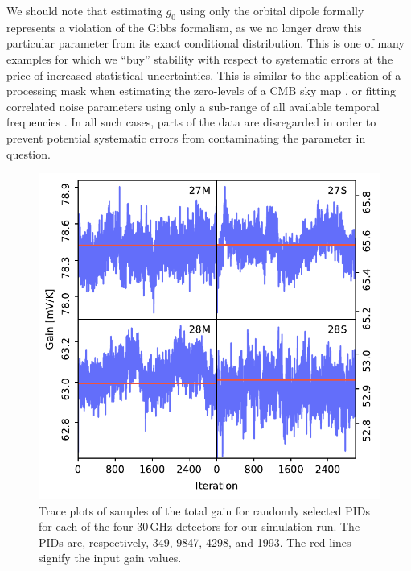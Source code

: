 \documentclass[twocolumn]{aa}
\begin{document}
We should note that estimating $g_0$ using only the orbital dipole
formally represents a violation of the Gibbs formalism, as we no
longer draw this particular parameter from its exact conditional
distribution. This is one of many examples for which we ``buy''
stability with respect to systematic errors at the price of increased
statistical uncertainties. This is similar to the application of a
processing mask when estimating the zero-levels of a CMB sky map
\citep[e.g.,][]{planck2014-a10}, or fitting correlated noise
parameters using only a sub-range of all available temporal
frequencies \citep[e.g.,][]{bp06}. In all such cases, parts of the
data are disregarded in order to prevent potential systematic errors
from contaminating the parameter in question.
\begin{figure}[t]
  \center
  \includegraphics[width=\linewidth]{figs/simtrace.pdf}
    \caption{Trace plots of samples of the total gain for randomly selected
    PIDs for each of the four 30\,GHz detectors for our simulation run. The
    PIDs are, respectively, 349, 9847, 4298, and 1993. The red lines signify
    the input gain values.}
  \label{fig:sim_traceplots}
\end{figure}
\end{document}

